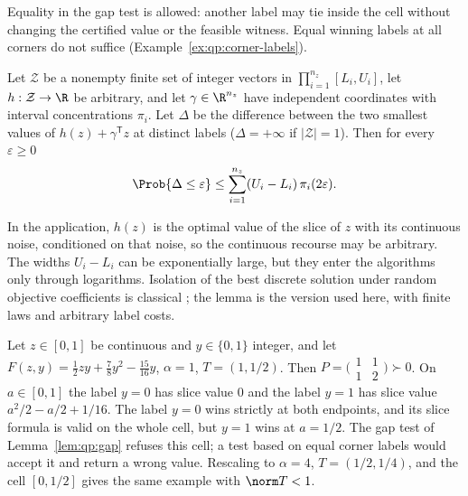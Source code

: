 Equality in the gap test is allowed: another label may tie inside the cell
without changing the certified value or the feasible witness. Equal winning
labels at all corners do not suffice (Example~\ref{ex:qp:corner-labels}).

\begin{lemma}\label{lem:qp:isolation}
Let $\mathcal Z$ be a nonempty finite set of integer vectors in
$\prod_{i=1}^{n_z}[L_i,U_i]$, let $h:\mathcal Z\to\R$ be arbitrary, and let
$\gamma\in\R^{n_z}$ have independent coordinates with interval concentrations
$\pi_i$. Let $\Delta$ be the difference between the two smallest values of
$h(z)+\gamma^{\mathsf T} z$ at distinct labels ($\Delta=+\infty$ if
$|\mathcal Z|=1$). Then for every $\varepsilon\ge0$
\[
 \Prob\{\Delta\le\varepsilon\}\le\sum_{i=1}^{n_z}(U_i-L_i)\,\pi_i(2\varepsilon).
\]
\end{lemma}

In the application, $h(z)$ is the optimal value of the slice of $z$ with its
continuous noise, conditioned on that noise, so the continuous recourse may
be arbitrary. The widths $U_i-L_i$ can be exponentially large, but they enter
the algorithms only through logarithms. Isolation of the best discrete
solution under random objective coefficients is classical
\cite{beier2006-typical-properties-of-winners-and,roglin2007-smoothed-analysis-of-integer-programming};
the lemma is the version used here, with finite laws and arbitrary label
costs.

\begin{example}\label{ex:qp:corner-labels}
Let $z\in[0,1]$ be continuous and $y\in\{0,1\}$ integer, and let
$F(z,y)=\frac12zy+\frac78y^2-\frac{15}{16}y$, $\alpha=1$, $T=(1,1/2)$. Then
$P=\bigl(\begin{smallmatrix}1&1\\1&2\end{smallmatrix}\bigr)\succ0$. On
$a\in[0,1]$ the label $y=0$ has slice value $0$ and the label $y=1$ has slice
value $a^2/2-a/2+1/16$. The label $y=0$ wins strictly at both endpoints, and
its slice formula is valid on the whole cell, but $y=1$ wins at $a=1/2$. The
gap test of Lemma~\ref{lem:qp:gap} refuses this cell; a test based on equal
corner labels would accept it and return a wrong value. Rescaling to
$\alpha=4$, $T=(1/2,1/4)$, and the cell $[0,1/2]$ gives the same example with
$\norm T<1$.
\end{example}

